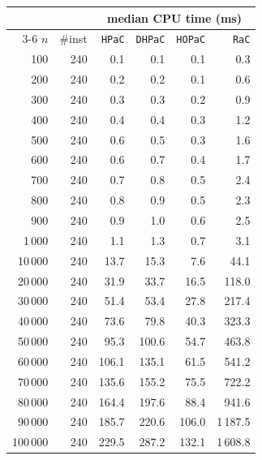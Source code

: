 \begin{tabular}{@{}rrrrrr@{}}
\toprule
 &  & \multicolumn{4}{c}{median CPU time (ms)} \\
\cmidrule(l){3-6}
$n$ & \#inst & \texttt{HPaC} & \texttt{DHPaC} & \texttt{HOPaC} & \texttt{RaC} \\
\midrule
100 & 240 & 0.1 & 0.1 & 0.1 & 0.3 \\
200 & 240 & 0.2 & 0.2 & 0.1 & 0.6 \\
300 & 240 & 0.3 & 0.3 & 0.2 & 0.9 \\
400 & 240 & 0.4 & 0.4 & 0.3 & 1.2 \\
500 & 240 & 0.6 & 0.5 & 0.3 & 1.6 \\
600 & 240 & 0.6 & 0.7 & 0.4 & 1.7 \\
700 & 240 & 0.7 & 0.8 & 0.5 & 2.4 \\
800 & 240 & 0.8 & 0.9 & 0.5 & 2.3 \\
900 & 240 & 0.9 & 1.0 & 0.6 & 2.5 \\
1\,000 & 240 & 1.1 & 1.3 & 0.7 & 3.1 \\
10\,000 & 240 & 13.7 & 15.3 & 7.6 & 44.1 \\
20\,000 & 240 & 31.9 & 33.7 & 16.5 & 118.0 \\
30\,000 & 240 & 51.4 & 53.4 & 27.8 & 217.4 \\
40\,000 & 240 & 73.6 & 79.8 & 40.3 & 323.3 \\
50\,000 & 240 & 95.3 & 100.6 & 54.7 & 463.8 \\
60\,000 & 240 & 106.1 & 135.1 & 61.5 & 541.2 \\
70\,000 & 240 & 135.6 & 155.2 & 75.5 & 722.2 \\
80\,000 & 240 & 164.4 & 197.6 & 88.4 & 941.6 \\
90\,000 & 240 & 185.7 & 220.6 & 106.0 & 1\,187.5 \\
100\,000 & 240 & 229.5 & 287.2 & 132.1 & 1\,608.8 \\
\bottomrule
\end{tabular}

